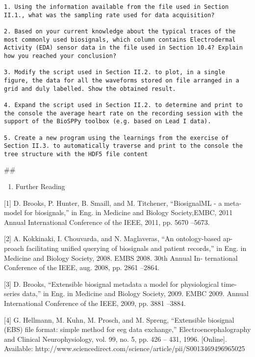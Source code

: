 \documentclass[11pt]{article}
\providecommand{\tightlist}{%
      \setlength{\itemsep}{0pt}\setlength{\parskip}{0pt}}
\begin{document}
\begin{verbatim}
1. Using the information available from the file used in Section II.1., what was the sampling rate used for data acquisition?

2. Based on your current knowledge about the typical traces of the most commonly used biosignals, which column contains Electrodermal Activity (EDA) sensor data in the file used in Section 10.4? Explain how you reached your conclusion?

3. Modify the script used in Section II.2. to plot, in a single figure, the data for all the waveforms stored on file arranged in a grid and duly labelled. Show the obtained result.

4. Expand the script used in Section II.2. to determine and print to the console the average heart rate on the recording session with the support of the BioSPPy toolbox (e.g. based on Lead I data).

5. Create a new program using the learnings from the exercise of Section II.3. to automatically traverse and print to the console the tree structure with the HDF5 file content
\end{verbatim}

    \#\#

\begin{enumerate}
\def\labelenumi{\arabic{enumi}.}
\setcounter{enumi}{1}
\tightlist
\item
  Further Reading
\end{enumerate}

{[}1{]} D. Brooks, P. Hunter, B. Smaill, and M. Titchener, ``BiosignalML
- a meta- model for biosignals,'' in Eng. in Medicine and Biology
Society,EMBC, 2011 Annual International Conference of the IEEE, 2011,
pp. 5670 --5673.

{[}2{]} A. Kokkinaki, I. Chouvarda, and N. Maglaveras, ``An
ontology-based ap- proach facilitating unified querying of biosignals
and patient records,'' in Eng. in Medicine and Biology Society, 2008.
EMBS 2008. 30th Annual In- ternational Conference of the IEEE, aug.
2008, pp. 2861 --2864.

{[}3{]} D. Brooks, ``Extensible biosignal metadata a model for
physiological time- series data,'' in Eng. in Medicine and Biology
Society, 2009. EMBC 2009. Annual International Conference of the IEEE,
2009, pp. 3881 --3884.

{[}4{]} G. Hellmann, M. Kuhn, M. Prosch, and M. Spreng, ``Extensible
biosignal (EBS) file format: simple method for eeg data exchange,''
Electroencephalography and Clinical Neurophysiology, vol. 99, no. 5, pp.
426 -- 431, 1996. {[}Online{]}. Available:
http://www.sciencedirect.com/science/article/pii/S0013469496965025
\end{document}
